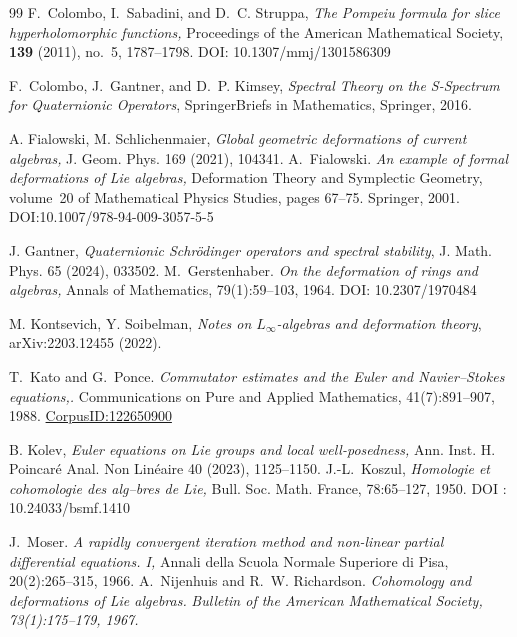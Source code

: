 \documentclass[10pt]{amsart}
\numberwithin{equation}{section}
\theoremstyle{remark}
\theoremstyle{definition}
\begin{document}
\begin{thebibliography}{99}
F.~Colombo, I.~Sabadini, and D.~C. Struppa,
\emph{ The Pompeiu formula for slice hyperholomorphic functions,}
Proceedings of the American Mathematical Society, \textbf{139} (2011), no.~5, 1787--1798. DOI: 10.1307/mmj/1301586309



F.~Colombo, J.~Gantner, and D.~P. Kimsey,
\emph{Spectral Theory on the S-Spectrum for Quaternionic Operators},
 SpringerBriefs in Mathematics, Springer, 2016.


 A. Fialowski, M. Schlichenmaier, \emph{Global geometric deformations of current algebras,} J. Geom. Phys. 169 (2021), 104341.
A.~Fialowski.
\emph{An example of formal deformations of Lie algebras,}
 Deformation Theory and Symplectic Geometry, volume~20 of
   Mathematical Physics Studies, pages 67--75. Springer, 2001. DOI:10.1007/978-94-009-3057-5-5


 J. Gantner, \emph{Quaternionic Schrödinger operators and spectral stability}, J. Math. Phys. 65 (2024), 033502.
M.~Gerstenhaber.
\emph{ On the deformation of rings and algebras,}
 Annals of Mathematics, 79(1):59--103, 1964.  DOI: 10.2307/1970484

 M. Kontsevich, Y. Soibelman, \emph{Notes on $L_\infty$-algebras and deformation theory}, arXiv:2203.12455 (2022).

T.~Kato and G.~Ponce.
 \emph{Commutator estimates and the Euler and Navier--Stokes equations,.}
Communications on Pure and Applied Mathematics, 41(7):891--907, 1988. \href{https://api.semanticscholar.org/CorpusID:122650900} {CorpusID:122650900}

 B. Kolev, \emph{Euler equations on Lie groups and local well-posedness,} Ann. Inst. H. Poincaré Anal. Non Linéaire 40 (2023), 1125–1150.
J.-L.~Koszul,
 \emph{Homologie et cohomologie des alg--bres de Lie,}
 Bull. Soc. Math. France, 78:65--127, 1950. DOI : 10.24033/bsmf.1410

J.~Moser.
  \emph{A rapidly convergent iteration method and non-linear partial differential equations. I,}
Annali della Scuola Normale Superiore di Pisa, 20(2):265--315, 1966.
A.~Nijenhuis and R.~W. Richardson.
\emph{ Cohomology and deformations of Lie algebras.}
\em Bulletin of the American Mathematical Society, 73(1):175--179, 1967.




\end{thebibliography}
\end{document}

